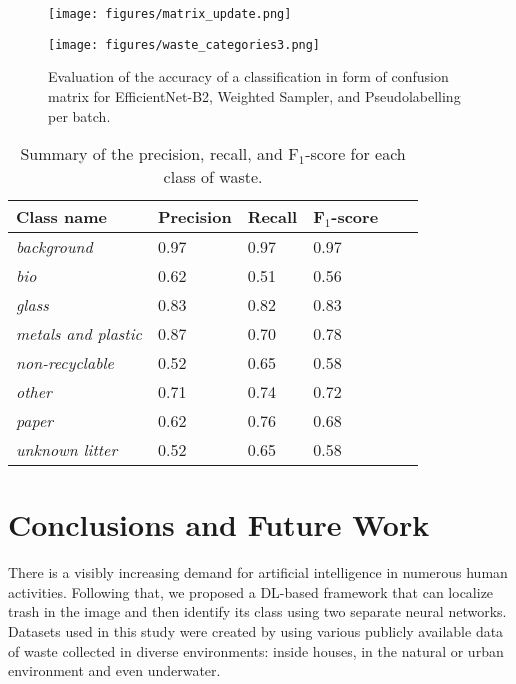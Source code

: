 \documentclass{article}
\begin{document}
\begin{figure}[htb]
    \begin{minipage}[c]{.55\textwidth}
        \centering
        \texttt{[image: figures/matrix\_update.png]}
    \end{minipage}
    \hfill
    \begin{minipage}[c]{.35\textwidth}
        \centering
        \texttt{[image: figures/waste\_categories3.png]}
    \end{minipage}
    \caption{Evaluation of the accuracy of a classification in form of confusion matrix for EfficientNet-B2, Weighted Sampler, and Pseudolabelling per batch. \label{fig:conf_matrix}}
\end{figure}


\begin{table}[!ht]
    \centering
    \caption{Summary of the precision, recall, and F$_1$-score for each class of waste.}
    \label{tab:classifcation_report}
    \begin{tabular}{llllll}
    \hline
        \textbf{Class name} & \textbf{Precision} & \textbf{Recall} & \textbf{F$_1$-score} \\ \hline
            \textit{background} & 0.97 & 0.97 & 0.97 \\
            \textit{bio} & 0.62 & 0.51 & 0.56 \\
            \textit{glass} & 0.83 & 0.82 & 0.83 \\
            \textit{metals and plastic} & 0.87 & 0.70 & 0.78 \\
            \textit{non-recyclable} & 0.52 & 0.65 & 0.58 \\
            \textit{other} & 0.71 & 0.74 & 0.72 \\
            \textit{paper} & 0.62 & 0.76 & 0.68 \\
            \textit{unknown litter} & 0.52 & 0.65 & 0.58 \\ \hline
    \end{tabular}
\end{table}

 
\newpage
\section{Conclusions and Future Work}
\label{sec:conclusions}

There is a visibly increasing demand for artificial intelligence in numerous human activities. Following that, we proposed a DL-based framework that can localize trash in the image and then identify its class using two separate neural networks. Datasets used in this study were created by using various publicly available data of waste collected in diverse environments: inside houses, in the natural or urban environment and even underwater.
\end{document}
